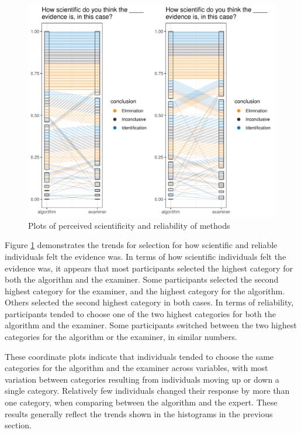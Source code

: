 \documentclass[print]{nuthesis}
\begin{document}
\begin{figure}

{\centering \includegraphics[width=\linewidth]{thesis_files/figure-latex/coordscirel-1} 

}

\caption{Plots of perceived scientificity and reliability of methods}\label{fig:coordscirel}
\end{figure}

Figure \ref{fig:coordscirel} demonstrates the trends for selection for how scientific and reliable individuals felt the evidence was.
In terms of how scientific individuals felt the evidence was, it appears that most participants selected the highest category for both the algorithm and the examiner.
Some participants selected the second highest category for the examiner, and the highest category for the algorithm.
Others selected the second highest category in both cases.
In terms of reliability, participants tended to choose one of the two highest categories for both the algorithm and the examiner.
Some participants switched between the two highest categories for the algorithm or the examiner, in similar numbers.

These coordinate plots indicate that individuals tended to choose the same categories for the algorithm and the examiner across variables, with most variation between categories resulting from individuals moving up or down a single category.
Relatively few individuals changed their response by more than one category, when comparing between the algorithm and the expert.
These results generally reflect the trends shown in the histograms in the previous section.
\end{document}
